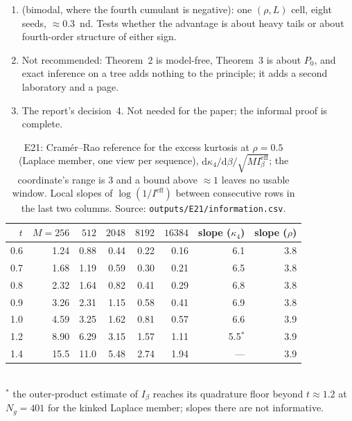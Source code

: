 \begin{enumerate}[label=\textbf{P2.\arabic*}]
\item {} (bimodal, where the fourth cumulant is negative): one $(\rho,L)$ cell, eight seeds, $\approx0.3$~nd. Tests whether the advantage is about heavy tails or about fourth-order structure of either sign.
\item {} Not recommended: Theorem~2 is model-free, Theorem~3 is about $P_0$, and exact inference on a tree adds nothing to the principle; it adds a second laboratory and a page.
\item {} The report's decision~4. Not needed for the paper; the informal proof is complete.
\end{enumerate}

\begin{table}[h]\centering\small
\caption{E21: Cram\'er--Rao reference for the excess kurtosis at $\rho=0.5$ (Laplace member, one view per sequence), $\mathrm{d}\kappa_4/\mathrm{d}\beta/\sqrt{MI^{\mathrm{eff}}_\beta}$; the coordinate's range is $3$ and a bound above $\approx1$ leaves no usable window. Local slopes of $\log(1/I^{\mathrm{eff}})$ between consecutive rows in the last two columns. Source: \texttt{outputs/E21/information.csv}.}
\label{tab:crb}
\begin{tabular}{@{}rrrrrrrr@{}}
\toprule
$t$ & $M=256$ & $512$ & $2048$ & $8192$ & $16384$ & slope ($\kappa_4$) & slope ($\rho$) \\
\midrule
0.6 & 1.24 & 0.88 & 0.44 & 0.22 & 0.16 & 6.1 & 3.8 \\
0.7 & 1.68 & 1.19 & 0.59 & 0.30 & 0.21 & 6.5 & 3.8 \\
0.8 & 2.32 & 1.64 & 0.82 & 0.41 & 0.29 & 6.8 & 3.8 \\
0.9 & 3.26 & 2.31 & 1.15 & 0.58 & 0.41 & 6.9 & 3.8 \\
1.0 & 4.59 & 3.25 & 1.62 & 0.81 & 0.57 & 6.6 & 3.9 \\
1.2 & 8.90 & 6.29 & 3.15 & 1.57 & 1.11 & 5.5$^\ast$ & 3.9 \\
1.4 & 15.5 & 11.0 & 5.48 & 2.74 & 1.94 & --- & 3.9 \\
\bottomrule
\end{tabular}\\[2pt]
{\footnotesize $^\ast$ the outer-product estimate of $I_\beta$ reaches its quadrature floor beyond $t\approx1.2$ at $N_g=401$ for the kinked Laplace member; slopes there are not informative.}
\end{table}
